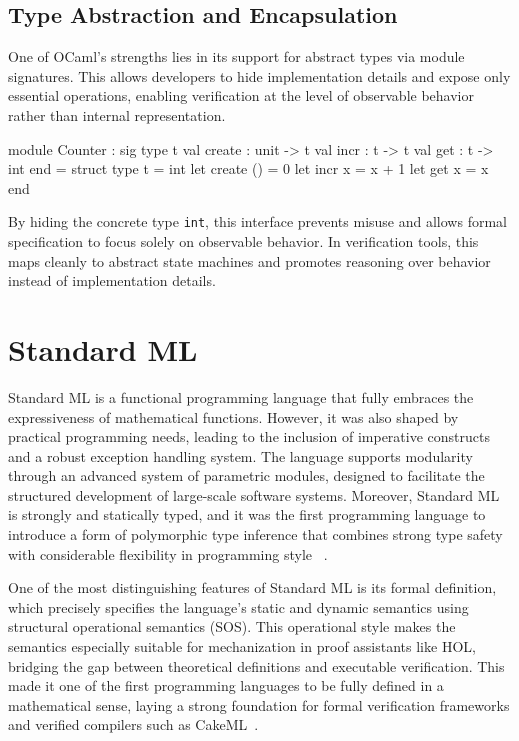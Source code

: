 \subsection{Type Abstraction and Encapsulation}

One of OCaml's strengths lies in its support for abstract types via module signatures. This allows developers to hide 
implementation details and expose only essential operations, enabling verification at the level of observable behavior rather 
than internal representation.

\begin{ocamlenv}
  module Counter : sig
    type t
    val create : unit -> t
    val incr : t -> t
    val get : t -> int
  end = struct
    type t = int
    let create () = 0
    let incr x = x + 1
    let get x = x
  end
\end{ocamlenv}

By hiding the concrete type \texttt{int}, this interface prevents misuse and allows formal specification to focus solely on 
observable behavior. In verification tools, this maps cleanly to abstract state machines and promotes reasoning over 
behavior instead of implementation details.


\section{Standard ML}
\label{sec:Standard_ML}

Standard ML is a functional programming language that fully embraces the expressiveness of mathematical functions. 
However, it was also shaped by practical programming needs, leading to the inclusion of imperative constructs and a 
robust exception handling system. The language supports modularity through an advanced system of parametric modules, 
designed to facilitate the structured development of large-scale software systems. Moreover, Standard ML is strongly 
and statically typed, and it was the first programming language to introduce a form of polymorphic type inference that 
combines strong type safety with considerable flexibility in programming style ~\cite{milner1997definition}.

One of the most distinguishing features of Standard ML is its formal definition, which precisely specifies the language's 
static and dynamic semantics using structural operational semantics (SOS). This operational style makes the semantics 
especially suitable for mechanization in proof assistants like HOL, bridging the gap between theoretical definitions 
and executable verification. This made it one of the first programming languages to be fully defined in a mathematical 
sense, laying a strong foundation for formal verification frameworks and verified compilers such as 
CakeML~\cite{milner1997definition, SewellMTKMAO23}. 

